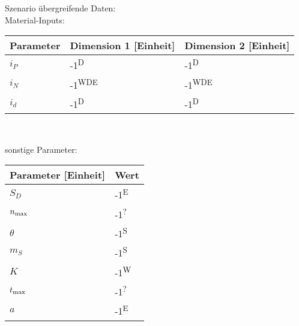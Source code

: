 \newcommand{\sourceD}{\textsuperscript{D}} %
\newcommand{\sourceW}{\textsuperscript{W}} %
\newcommand{\sourceS}{\textsuperscript{S}} %
\newcommand{\sourceE}{\textsuperscript{E}} %
\newcommand{\sourceM}{\textsuperscript{M}} %
\newcommand{\sourceL}{\textsuperscript{L}} %
\newcommand{\sourceU}{\textsuperscript{?}} %

\begin{table}
    Szenario übergreifende Daten:\\
    Material-Inputs:\\

    {\centering
    \begin{tabular}[h]{p{5cm}p{3cm}p{3cm}}
        \toprule
        Parameter & Dimension 1 [Einheit] & Dimension 2 [Einheit] \\
        \midrule
        $i_P$       &-1\sourceD      &-1\sourceD\\
        $i_N$       &-1\sourceW\sourceD\sourceE
        &-1\sourceW\sourceD\sourceE\\
        $i_d$       &-1\sourceD     &-1\sourceD\\
        \bottomrule
    \end{tabular}\\[10pt]}

    sonstige Parameter:\\

    {\centering
    \begin{tabular}[h]{p{5cm}p{5cm}}
        \toprule
        Parameter [Einheit] & Wert \\
        \midrule
        $S_D$           &-1\sourceE\\
        $n_\text{max}$       &-1\sourceU\\
        $\theta$        &-1\sourceS\\
        $m_S$           &-1\sourceS\\
        $K$             &-1\sourceW\\
        $t_\text{max}$       &-1\sourceU\\
        $a$             &-1\sourceE\\
        \bottomrule
    \end{tabular}\\[10pt]}


\end{table}
